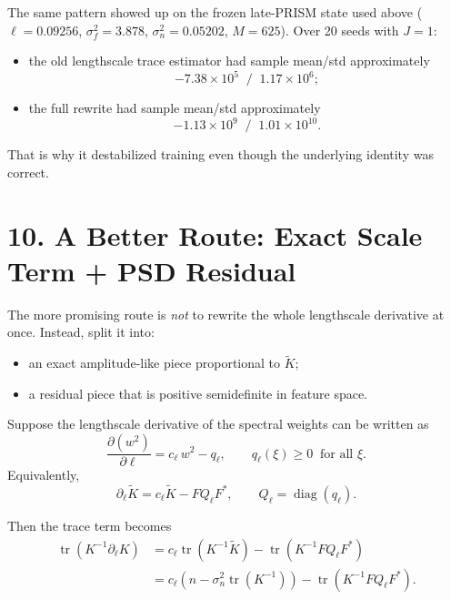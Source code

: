 \documentclass[11pt]{article}
\begin{document}
The same pattern showed up on the frozen late-PRISM state used above
($\ell=0.09256$, $\sigma_f^2=3.878$, $\sigma_n^2=0.05202$, $M=625$). Over 20
seeds with $J=1$:
\begin{itemize}
  \item the old lengthscale trace estimator had sample mean/std approximately
  \[
    -7.38\times 10^5 \;\; / \;\; 1.17\times 10^6;
  \]
  \item the full rewrite had sample mean/std approximately
  \[
    -1.13\times 10^9 \;\; / \;\; 1.01\times 10^{10}.
  \]
\end{itemize}

That is why it destabilized training even though the underlying identity was
correct.

\section*{10. A Better Route: Exact Scale Term + PSD Residual}

The more promising route is \emph{not} to rewrite the whole lengthscale
derivative at once. Instead, split it into:
\begin{itemize}
  \item an exact amplitude-like piece proportional to $\widetilde K$;
  \item a residual piece that is positive semidefinite in feature space.
\end{itemize}

Suppose the lengthscale derivative of the spectral weights can be written as
\begin{equation}
\frac{\partial (w^2)}{\partial \ell}
=
c_\ell \, w^2 - q_\ell,
\qquad
q_\ell(\xi) \ge 0
\;\;\text{for all }\xi.
\end{equation}
Equivalently,
\begin{equation}
\partial_\ell \widetilde K
=
c_\ell \widetilde K - F Q_\ell F^\ast,
\qquad
Q_\ell = \operatorname{diag}(q_\ell).
\end{equation}

Then the trace term becomes
\begin{align}
\operatorname{tr}\!\left(K^{-1}\partial_\ell K\right)
&=
c_\ell \operatorname{tr}(K^{-1}\widetilde K)
-
\operatorname{tr}\!\left(K^{-1} F Q_\ell F^\ast\right) \\
&=
c_\ell \left(n - \sigma_n^2 \operatorname{tr}(K^{-1})\right)
-
\operatorname{tr}\!\left(K^{-1} F Q_\ell F^\ast\right).
\end{align}
\end{document}
